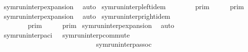 \begin{isabellebody}
%
\isadelimproof
%
\endisadelimproof
%
\isatagproof
{}\isamarkupfalse%
\ symrun{\isacharunderscore}interp{\isacharunderscore}expansion\ \isamarkupfalse%
\ auto%
\endisatagproof
{\isafoldproof}%
%
\isadelimproof
\isanewline
%
\endisadelimproof
\isanewline
{}\isamarkupfalse%
\ symrun{\isacharunderscore}interp{\isacharunderscore}left{\isacharunderscore}idem{\isacharcolon}\isanewline
\ \ {\isacartoucheopen}{\isasymlbrakk}{\isasymlbrakk}\ {\isasymGamma}\ {\isacharat}\ {\isacharparenleft}{\isasymGamma}\ {\isacharat}\ {\isasymGamma}\ {\isasymrbrakk}{\isasymrbrakk}\isactrlsub p\isactrlsub r\isactrlsub i\isactrlsub m\ {\isacharequal}\ {\isasymlbrakk}{\isasymlbrakk}\ {\isasymGamma}\ {\isacharat}\ {\isasymGamma}\ {\isasymrbrakk}{\isasymrbrakk}\isactrlsub p\isactrlsub r\isactrlsub i\isactrlsub m{\isacartoucheclose}\isanewline
%
\isadelimproof
%
\endisadelimproof
%
\isatagproof
{}\isamarkupfalse%
\ symrun{\isacharunderscore}interp{\isacharunderscore}expansion\ \isamarkupfalse%
\ auto%
\endisatagproof
{\isafoldproof}%
%
\isadelimproof
\isanewline
%
\endisadelimproof
\isanewline
{}\isamarkupfalse%
\ symrun{\isacharunderscore}interp{\isacharunderscore}right{\isacharunderscore}idem{\isacharcolon}\isanewline
\ \ {\isacartoucheopen}{\isasymlbrakk}{\isasymlbrakk}\ {\isacharparenleft}{\isasymGamma}\ {\isacharat}\ {\isasymGamma}\ {\isacharat}\ {\isasymGamma}\ {\isasymrbrakk}{\isasymrbrakk}\isactrlsub p\isactrlsub r\isactrlsub i\isactrlsub m\ {\isacharequal}\ {\isasymlbrakk}{\isasymlbrakk}\ {\isasymGamma}\ {\isacharat}\ {\isasymGamma}\ {\isasymrbrakk}{\isasymrbrakk}\isactrlsub p\isactrlsub r\isactrlsub i\isactrlsub m{\isacartoucheclose}\isanewline
%
\isadelimproof
%
\endisadelimproof
%
\isatagproof
{}\isamarkupfalse%
\ symrun{\isacharunderscore}interp{\isacharunderscore}expansion\ \isamarkupfalse%
\ auto%
\endisatagproof
{\isafoldproof}%
%
\isadelimproof
\isanewline
%
\endisadelimproof
\isanewline
{}\isamarkupfalse%
\ symrun{\isacharunderscore}interp{\isacharunderscore}aci\ {\isacharequal}\ \ symrun{\isacharunderscore}interp{\isacharunderscore}commute\isanewline
\ \ \ \ \ \ \ \ \ \ \ \ \ \ \ \ \ \ \ \ \ \ \ \ \ \ \ \ symrun{\isacharunderscore}interp{\isacharunderscore}assoc\isanewline

\end{isabellebody}
